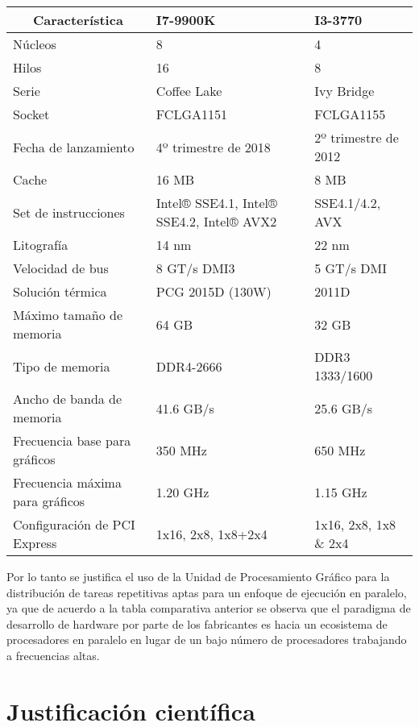 \documentclass[../main.tex]{subfiles}
\begin{document}
  \begin{table}[]
    \begin{tabular}{|p{5.6cm}|p{4cm}|p{4cm}|}
      \hline
      \multicolumn{1}{|c|}{\textbf{Característica}} & \textbf{I7-9900K} & \textbf{I3-3770} \\ \hline
      Núcleos & 8 & 4 \\ \hline
      Hilos & 16 & 8 \\ \hline
      Serie & Coffee Lake & Ivy Bridge \\ \hline
      Socket & FCLGA1151 & FCLGA1155 \\ \hline
      Fecha de lanzamiento & 4º trimestre de 2018 & 2º trimestre de 2012 \\ \hline
      Cache & 16 MB & 8 MB \\ \hline
      Set de instrucciones & Intel® SSE4.1, Intel® SSE4.2, Intel® AVX2 & SSE4.1/4.2, AVX \\ \hline
      Litografía & 14 nm & 22 nm \\ \hline
      Velocidad de bus & 8 GT/s DMI3 & 5 GT/s DMI \\ \hline
      Solución térmica & PCG 2015D (130W) & 2011D \\ \hline
      Máximo tamaño de memoria & 64 GB & 32 GB \\ \hline
      Tipo de memoria & DDR4-2666 & DDR3 1333/1600 \\ \hline
      Ancho de banda de memoria & 41.6 GB/s & 25.6 GB/s \\ \hline
      Frecuencia base para gráficos & 350 MHz & 650 MHz \\ \hline
      Frecuencia máxima para gráficos & 1.20 GHz & 1.15 GHz \\ \hline
      Configuración de PCI Express & 1x16, 2x8, 1x8+2x4 & 1x16, 2x8, 1x8 \& 2x4 \\ \hline
    \end{tabular}
  \end{table}

  Por lo tanto se justifica el uso de la Unidad de Procesamiento Gráfico para la distribución de tareas repetitivas aptas para un enfoque de ejecución en paralelo, ya que de acuerdo a la tabla comparativa anterior se observa que el paradigma de desarrollo de hardware por parte de los fabricantes es hacia un ecosistema de procesadores en paralelo en lugar de un bajo número de procesadores trabajando a frecuencias altas.

  \section{Justificación científica}







  \bibliografia
\end{document}
